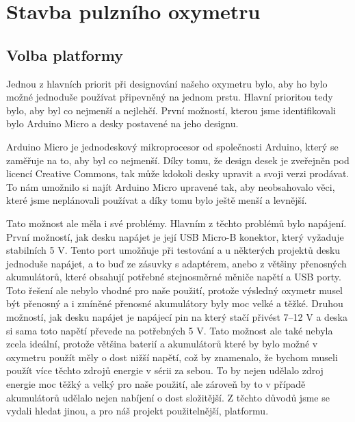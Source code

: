 \section {Stavba pulzního oxymetru}
\subsection {Volba platformy}
Jednou z hlavních priorit při designování našeho oxymetru bylo, aby ho bylo možné jednoduše používat připevněný na jednom prstu. Hlavní prioritou tedy bylo, aby byl co nejmenší a nejlehčí. První možností, kterou jsme identifikovali bylo Arduino Micro a desky postavené na jeho designu.
\par Arduino Micro je jednodeskový mikroprocesor od společnosti Arduino, který se zaměřuje na to, aby byl co nejmenší. Díky tomu, že design desek je zveřejněn pod licencí Creative Commons, tak může kdokoli desky upravit a svoji verzi prodávat. To nám umožnilo si najít Arduino Micro upravené tak, aby neobsahovalo věci, které jsme neplánovali používat a díky tomu bylo ještě menší a levnější.
\par Tato možnost ale měla i své problémy. Hlavním z těchto problémů bylo napájení. První možností, jak desku napájet je její USB Micro-B konektor, který vyžaduje stabilních 5 V. Tento port umožňuje při testování a u některých projektů desku jednoduše napájet, a to buď ze zásuvky s adaptérem, anebo z většiny přenosných akumulátorů, které obsahují potřebné stejnosměrné měniče napětí a USB porty. Toto řešení ale nebylo vhodné pro naše použití, protože výsledný oxymetr musel být přenosný a i zmíněné přenosné akumulátory byly moc velké a těžké. Druhou možností, jak desku napájet je napájecí pin na který stačí přivést 7–12 V a deska si sama toto napětí převede na potřebných 5 V. Tato možnost ale také nebyla zcela ideální, protože většina baterií a akumulátorů které by bylo možné v oxymetru použít měly o dost nižší napětí, což by znamenalo, že bychom museli použít více těchto zdrojů energie v sérii za sebou. To by nejen udělalo zdroj energie moc těžký a velký pro naše použití, ale zároveň by to v případě akumulátorů udělalo nejen nabíjení o dost složitější. Z těchto důvodů jsme se vydali hledat jinou, a pro náš projekt použitelnější, platformu.
